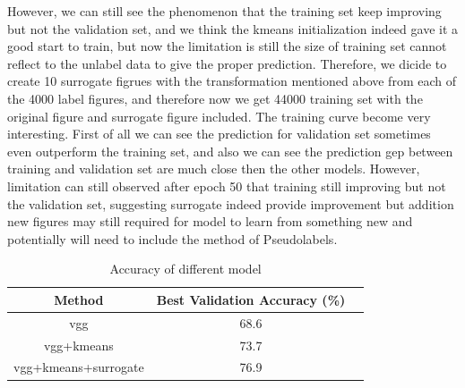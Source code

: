 \documentclass[final]{siamltexmm}
\begin{document}
However, we can still see the phenomenon that the training set keep improving but not the validation set, and we think the kmeans initialization indeed gave it a good start to train, but now the limitation is still the size of training set cannot reflect to the unlabel data to give the proper prediction. Therefore, we dicide to create 10 surrogate figrues with the transformation mentioned above from each of the 4000 label figures, and therefore now we get 44000 training set with the original figure and surrogate figure included. The training curve become very interesting. First of all we can see the prediction for validation set sometimes even outperform the training set, and also we can see the prediction gep between training and validation set are much close then the other models. However, limitation can still observed after epoch 50 that training still improving but not the validation set, suggesting surrogate indeed provide improvement but addition new figures may still required for model to learn from something new and potentially will need to include the method of Pseudo­labels.
\begin{table}[H]
\begin{center}
    \begin{tabular}{| c | c | c |}
    \hline
    Method & Best Validation Accuracy (\%) \\ \hline
    vgg & 68.6 \\ \hline
    vgg+kmeans & 73.7 \\ \hline
    vgg+kmeans+surrogate & 76.9 \\ \hline
    \end{tabular}
\end{center}
\caption{Accuracy of different model}
\end{table}
\end{document}
